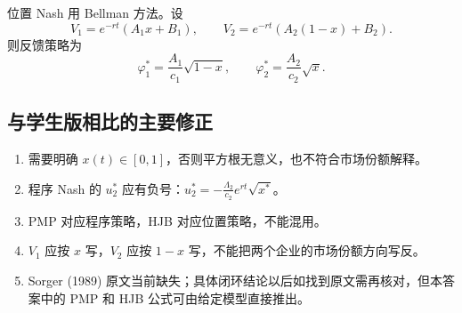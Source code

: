\documentclass[12pt,a4paper]{article}
\begin{document}
位置 Nash 用 Bellman 方法。设
\[
 V_1=e^{-rt}(A_1x+B_1),\qquad V_2=e^{-rt}(A_2(1-x)+B_2).
\]
则反馈策略为
\[
 \varphi_1^*=\frac{A_1}{c_1}\sqrt{1-x},\qquad
 \varphi_2^*=\frac{A_2}{c_2}\sqrt{x}.
\]

\subsection{与学生版相比的主要修正}

\begin{enumerate}
\item 需要明确 $x(t)\in[0,1]$，否则平方根无意义，也不符合市场份额解释。
\item 程序 Nash 的 $u_2^*$ 应有负号：$u_2^*=-\frac{\Lambda_2}{c_2}e^{rt}\sqrt{x^*}$。
\item PMP 对应程序策略，HJB 对应位置策略，不能混用。
\item $V_1$ 应按 $x$ 写，$V_2$ 应按 $1-x$ 写，不能把两个企业的市场份额方向写反。
\item Sorger (1989) 原文当前缺失；具体闭环结论以后如找到原文需再核对，但本答案中的 PMP 和 HJB 公式可由给定模型直接推出。
\end{enumerate}
\end{document}
